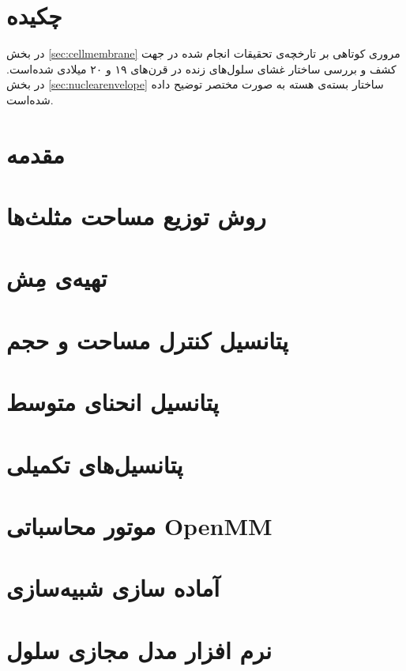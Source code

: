 \setRL
\clearpage
\def \MemMethod {\Mempath /MembraneMethod}

\section{
چکیده
}
در بخش
\ref{sec:cellmembrane}
مروری کوتاهی بر تارخچه‌ی تحقیقات انجام شده در جهت کشف و بررسی ساختار غشای سلول‌های زنده در قرن‌های ۱۹ و ۲۰ میلادی شده‌است. در بخش
\ref{sec:nuclearenvelope}
ساختار بسته‌ی هسته به صورت مختصر توضیح داده شده‌است.

\section{
مقدمه
}



\section{
روش توزیع مساحت مثلث‌ها
}


\section{
تهیه‌ی مِش
}


\section{
پتانسیل کنترل مساحت و حجم
}


\section{
پتانسیل انحنای متوسط
}



\section{
پتانسیل‌های تکمیلی
}


\section{
موتور محاسباتی
OpenMM
}

\section{
آماده سازی شبیه‌سازی
}

\section{
نرم افزار مدل مجازی سلول
}




